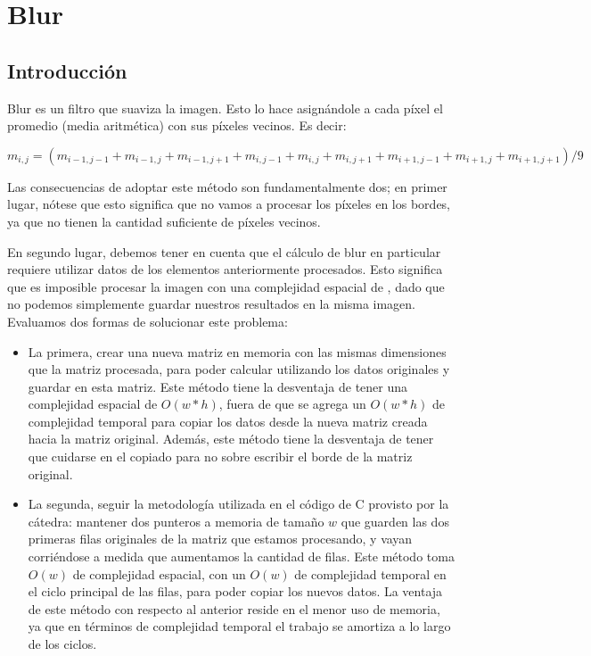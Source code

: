\section{Blur}

\subsection{Introducción}
Blur es un filtro que suaviza la imagen. Esto lo hace asignándole a cada píxel el promedio (media aritmética) con sus píxeles vecinos. Es decir:

$$m_{i, j} = (m_{i-1, j-1} + m_{i-1, j} + m_{i-1, j+1} + m_{i, j-1} + m_{i, j} + m_{i, j+1} + m_{i+1, j-1} + m_{i+1, j} + m_{i+1, j+1}) / 9$$

Las consecuencias de adoptar este método son fundamentalmente dos; en primer lugar, nótese que esto significa que no vamos a procesar los píxeles en los bordes, ya que no tienen la cantidad suficiente de píxeles vecinos.

En segundo lugar, debemos tener en cuenta que el cálculo de blur en particular requiere utilizar datos de los elementos anteriormente procesados. Esto significa que es imposible procesar la imagen con una complejidad espacial de , dado que no podemos simplemente guardar nuestros resultados en la misma imagen. Evaluamos dos formas de solucionar este problema:

\begin{itemize}
\item La primera, crear una nueva matriz en memoria con las mismas dimensiones que la matriz procesada, para poder calcular utilizando los datos originales y guardar en esta matriz. Este método tiene la desventaja de tener una complejidad espacial de $O(w*h)$, fuera de que se agrega un $O(w*h)$ de complejidad temporal para copiar los datos desde la nueva matriz creada hacia la matriz original. Además, este método tiene la desventaja de tener que cuidarse en el copiado para no sobre escribir el borde de la matriz original.

\item La segunda, seguir la metodología utilizada en el código de C provisto por la cátedra: mantener dos punteros a memoria de tamaño $w$ que guarden las dos primeras filas originales de la matriz que estamos procesando, y vayan corriéndose a medida que aumentamos la cantidad de filas. Este método toma $O(w)$ de complejidad espacial, con un $O(w)$ de complejidad temporal en el ciclo principal de las filas, para poder copiar los nuevos datos. La ventaja de este método con respecto al anterior reside en el menor uso de memoria, ya que en términos de complejidad temporal el trabajo se amortiza a lo largo de los ciclos.
\end{itemize}

